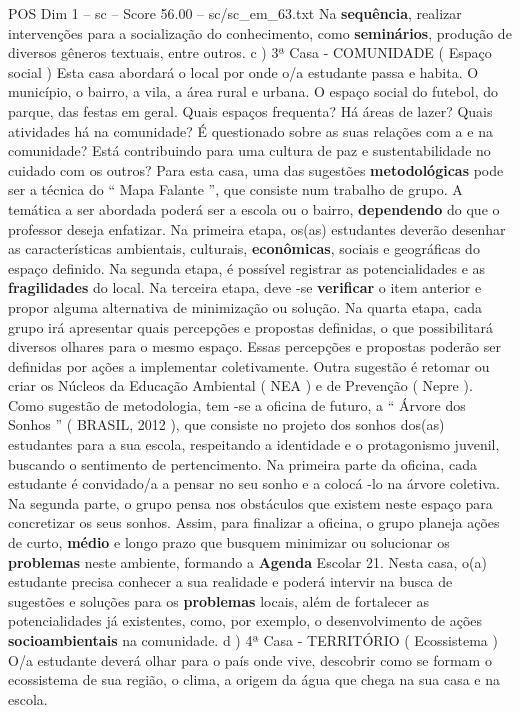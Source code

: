 \begin{textsample}{POS Dim 1 – sc – Score 56.00 – sc/sc\_em\_63.txt}
Na \textbf{sequência}, realizar intervenções para a socialização do conhecimento, como \textbf{seminários}, produção de diversos gêneros textuais, entre outros. c ) 3ª Casa - COMUNIDADE ( Espaço social ) Esta casa abordará o local por onde o/a estudante passa e habita.
O município, o bairro, a vila, a área rural e urbana.
O espaço social do futebol, do parque, das festas em geral.
Quais espaços frequenta?
Há áreas de lazer?
Quais atividades há na comunidade?
É questionado sobre as suas relações com a e na comunidade?
Está contribuindo para uma cultura de paz e sustentabilidade no cuidado com os outros?
Para esta casa, uma das sugestões \textbf{metodológicas} pode ser a técnica do “ Mapa Falante ”, que consiste num trabalho de grupo.
A temática a ser abordada poderá ser a escola ou o bairro, \textbf{dependendo} do que o professor deseja enfatizar.
Na primeira etapa, os(as) estudantes deverão desenhar as características ambientais, culturais, \textbf{econômicas}, sociais e geográficas do espaço definido.
Na segunda etapa, é possível registrar as potencialidades e as \textbf{fragilidades} do local.
Na terceira etapa, deve -se \textbf{verificar} o item anterior e propor alguma alternativa de minimização ou solução.
Na quarta etapa, cada grupo irá apresentar quais percepções e propostas definidas, o que possibilitará diversos olhares para o mesmo espaço.
Essas percepções e propostas poderão ser definidas por ações a implementar coletivamente.
Outra sugestão é retomar ou criar os Núcleos da Educação Ambiental ( NEA ) e de Prevenção ( Nepre ).
Como sugestão de metodologia, tem -se a oficina de futuro, a “ Árvore dos Sonhos ” ( BRASIL, 2012 ), que consiste no projeto dos sonhos dos(as) estudantes para a sua escola, respeitando a identidade e o protagonismo juvenil, buscando o sentimento de pertencimento.
Na primeira parte da oficina, cada estudante é convidado/a a pensar no seu sonho e a colocá -lo na árvore coletiva.
Na segunda parte, o grupo pensa nos obstáculos que existem neste espaço para concretizar os seus sonhos.
Assim, para finalizar a oficina, o grupo planeja ações de curto, \textbf{médio} e longo prazo que busquem minimizar ou solucionar os \textbf{problemas} neste ambiente, formando a \textbf{Agenda} Escolar 21.
Nesta casa, o(a) estudante precisa conhecer a sua realidade e poderá intervir na busca de sugestões e soluções para os \textbf{problemas} locais, além de fortalecer as potencialidades já existentes, como, por exemplo, o desenvolvimento de ações \textbf{socioambientais} na comunidade. d ) 4ª Casa - TERRITÓRIO ( Ecossistema ) O/a estudante deverá olhar para o país onde vive, descobrir como se formam o ecossistema de sua região, o clima, a origem da água que chega na sua casa e na escola.

\end{textsample}
